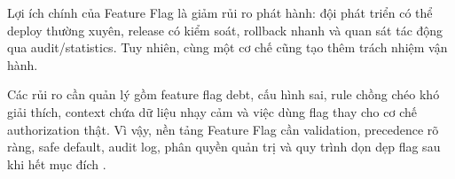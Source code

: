 Lợi ích chính của Feature Flag là giảm rủi ro phát hành: đội phát triển có thể deploy thường xuyên, release có kiểm soát, rollback nhanh và quan sát tác động qua audit/statistics. Tuy nhiên, cùng một cơ chế cũng tạo thêm trách nhiệm vận hành.

Các rủi ro cần quản lý gồm feature flag debt, cấu hình sai, rule chồng chéo khó giải thích, context chứa dữ liệu nhạy cảm và việc dùng flag thay cho cơ chế authorization thật. Vì vậy, nền tảng Feature Flag cần validation, precedence rõ ràng, safe default, audit log, phân quyền quản trị và quy trình dọn dẹp flag sau khi hết mục đích \cite{mahdavi_hezaveh_feature_toggles,owasp_rest_security,owasp_logging}.
